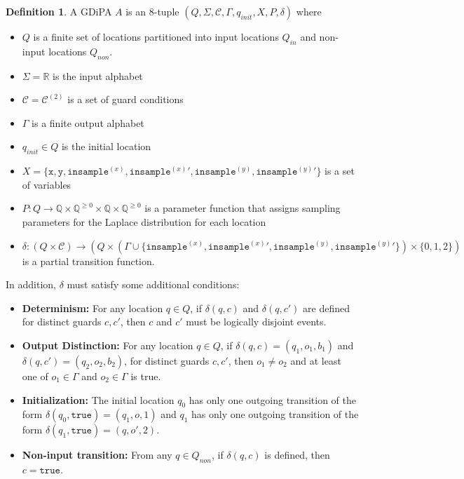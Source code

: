 \documentclass[12pt]{article}
\newcommand{\QQ}{\mathbb{Q}}
\newcommand{\RR}{\mathbb{R}}
\theoremstyle{definition}
\newtheorem{defn}[thm]{Definition}
\begin{document}
\begin{defn}
    A GDiPA $A$ is an 8-tuple $(Q, \Sigma, \mathcal{C}, \Gamma, q_{init}, X, P, \delta)$ where
    \begin{itemize}
        \item $Q$ is a finite set of locations partitioned into input locations $Q_{in}$ and non-input locations $Q_{non}$. 
        \item $\Sigma = \RR$ is the input alphabet
        \item $\mathcal{C} = \mathcal{C}^{(2)}$ is a set of guard conditions
        \item $\Gamma$ is a finite output alphabet
        \item $q_{init}\in Q$ is the initial location
        \item $X = \{\texttt{x}, \texttt{y}, \texttt{insample}^{(x)}, \texttt{insample}^{(x)}\prime, \texttt{insample}^{(y)}, \texttt{insample}^{(y)}\prime\}$ is a set of variables
        \item $P: Q\to \QQ\times \QQ^{\geq 0}\times \QQ\times  \QQ^{\geq 0}$ is a parameter function that assigns sampling parameters for the Laplace distribution for each location
        \item $\delta:(Q\times \mathcal{C})\to (Q\times (\Gamma \cup \{\texttt{insample}^{(x)}, \texttt{insample}^{(x)}\prime, \texttt{insample}^{(y)}, \texttt{insample}^{(y)}\prime\})\times \{0, 1, 2\})$ is a partial transition function. 
    \end{itemize}
    In addition, $\delta$ must satisfy some additional conditions:
    \begin{itemize}
        \item \textbf{Determinism:} For any location $q\in Q$, if $\delta(q, c)$ and $\delta(q, c')$ are defined for distinct guards $c, c'$,  then $c$ and $c'$ must be logically disjoint events.

        \item \textbf{Output Distinction:} For any location $q\in Q$, if $\delta(q, c) = (q_1, o_1, b_1)$ and $\delta(q, c') = (q_2, o_2, b_2)$, for distinct guards $c, c'$, then $o_1\neq o_2$ and at least one of $o_1\in \Gamma$ and $o_2\in \Gamma$ is true.

        \item \textbf{Initialization:} The initial location $q_0$ has only one outgoing transition of the form $\delta(q_0, \texttt{true}) = (q_1, o, 1)$ and $q_1$ has only one outgoing transition of the form $\delta(q_1, \texttt{true}) = (q, o', 2)$.

        \item \textbf{Non-input transition:} From any $q\in Q_{non}$, if $\delta(q, c)$ is defined, then $c=\texttt{true}$.
    \end{itemize}
\end{defn}
\end{document}
